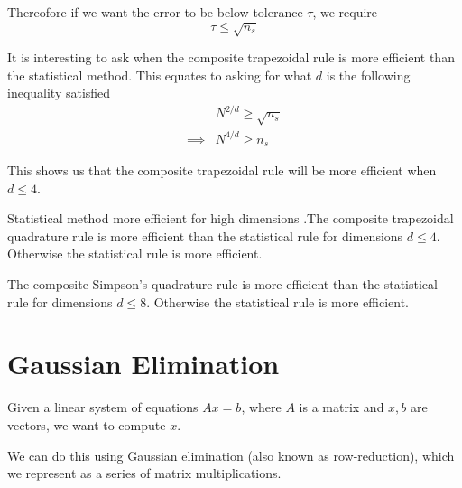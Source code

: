 \documentclass[12pt,letterpaper]{article}
\newcommand{\skipline}{\vspace{\baselineskip}}
\begin{document}
Thereofore if we want the error to be below tolerance $\tau$, we require
\begin{equation}
	\tau \leq \sqrt{n_s}
\end{equation}

It is interesting to ask when the composite trapezoidal rule is more efficient than the statistical method. This equates to asking for what $d$ is the following inequality satisfied
\begin{align}
	& N^{2/d} \geq \sqrt{n_s} \\
	\implies & N^{4/d} \geq n_s
\end{align}

This shows us that the composite trapezoidal rule will be more efficient when $d \leq 4$.

\begin{theo}{Statistical method more efficient for high dimensions}
.The composite trapezoidal quadrature rule is more efficient than the statistical rule for dimensions $d \leq 4$. Otherwise the statistical rule is more efficient.

\skipline

The composite Simpson's quadrature rule is more efficient than the statistical rule for dimensions $d \leq 8$. Otherwise the statistical rule is more efficient.
\label{thm:sampling}
\end{theo}


\section{Gaussian Elimination}
Given a linear system of equations $Ax = b$, where $A$ is a matrix and $x, b$ are vectors, we want to compute $x$.

We can do this using Gaussian elimination (also known as row-reduction), which we represent as a series of matrix multiplications.
\end{document}
